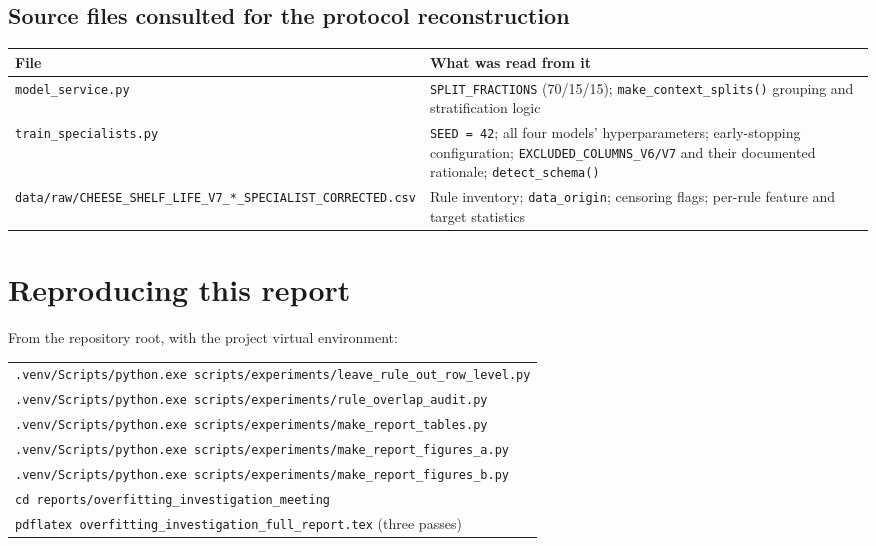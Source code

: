 \section{Source files consulted for the protocol reconstruction}

\begin{center}\small
\begin{tabular}{p{4.6cm}p{8.4cm}}
\toprule
File & What was read from it \\
\midrule
\texttt{model\_service.py} &
\texttt{SPLIT\_FRACTIONS} (70/15/15); \texttt{make\_context\_splits()}
grouping and stratification logic \\
\texttt{train\_specialists.py} &
\texttt{SEED = 42}; all four models' hyperparameters; early-stopping
configuration; \texttt{EXCLUDED\_COLUMNS\_V6/V7} and their documented
rationale; \texttt{detect\_schema()} \\
\texttt{data/raw/CHEESE\_SHELF\_LIFE\_V7\_*\_SPECIALIST\_CORRECTED.csv} &
Rule inventory; \texttt{data\_origin}; censoring flags; per-rule feature
and target statistics \\
\bottomrule
\end{tabular}
\end{center}

\chapter{Reproducing this report}

From the repository root, with the project virtual environment:

\begin{center}\small
\begin{tabular}{p{12.8cm}}
\toprule
\texttt{.venv/Scripts/python.exe scripts/experiments/leave\_rule\_out\_row\_level.py} \\
\texttt{.venv/Scripts/python.exe scripts/experiments/rule\_overlap\_audit.py} \\
\texttt{.venv/Scripts/python.exe scripts/experiments/make\_report\_tables.py} \\
\texttt{.venv/Scripts/python.exe scripts/experiments/make\_report\_figures\_a.py} \\
\texttt{.venv/Scripts/python.exe scripts/experiments/make\_report\_figures\_b.py} \\
\addlinespace[2pt]
\texttt{cd reports/overfitting\_investigation\_meeting} \\
\texttt{pdflatex overfitting\_investigation\_full\_report.tex} (three passes) \\
\bottomrule
\end{tabular}
\end{center}

